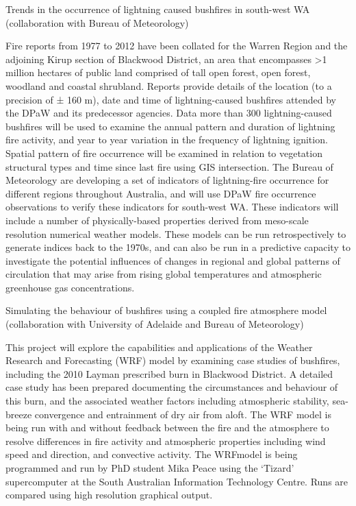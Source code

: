 \documentclass[version=last, paper=a4, DIV=18, usenames, dvipsnames]{scrartcl}
\begin{document}
Trends in the occurrence of lightning caused bushfires in south-west WA (collaboration with Bureau of Meteorology)


Fire reports from 1977 to 2012 have been collated for the Warren Region and the adjoining Kirup section of Blackwood District, an area that encompasses >1 million hectares of public land comprised  of tall open forest, open forest, woodland and coastal shrubland. Reports provide details of the     location (to a precision of ± 160 m), date and time of lightning-caused bushfires attended by the DPaW and its predecessor agencies. Data more than 300 lightning-caused bushfires will be used to examine  the annual pattern and duration of lightning fire activity, and year to year variation in the frequency of  lightning ignition. Spatial pattern of fire occurrence will be examined in relation to vegetation structural  types and time since last fire using GIS intersection. The Bureau of Meteorology are developing a set  of indicators of lightning-fire occurrence for different regions throughout Australia, and will use DPaW  fire occurrence observations to verify these indicators for south-west WA. These indicators will include a number of physically-based properties derived from meso-scale resolution numerical weather     models. These models can be run retrospectively to generate indices back to the 1970s, and can also  be run in a predictive capacity to investigate the potential influences of changes in regional and global  patterns of circulation that may arise from rising global temperatures and atmospheric greenhouse gas  concentrations.


Simulating the behaviour of bushfires using a coupled fire atmosphere model (collaboration with University of Adelaide and Bureau of Meteorology)


This project will explore the capabilities and applications of the Weather Research and Forecasting (WRF) model by examining case studies of bushfires, including the 2010 Layman prescribed burn in  Blackwood District. A detailed case study has been prepared documenting the circumstances and behaviour of this burn, and the associated weather factors including atmospheric stability, sea-breeze  convergence and entrainment of dry air from aloft. The WRF model is being run with and without  feedback between the fire and the atmosphere to resolve differences in fire activity and atmospheric properties including wind speed and direction, and convective activity. The WRFmodel is being programmed and run by PhD student Mika Peace using the `Tizard' supercomputer at the South  Australian Information Technology Centre. Runs are compared using high resolution graphical output.
\end{document}
